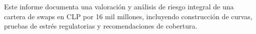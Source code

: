 \documentclass[
	spanish, %
	a4paper, oneside
]{article}
\begin{document}
\templatePortrait

\templatePagecfg

\begin{abstractd}
	Este informe documenta una valoración y análisis de riesgo integral de una cartera de swaps en CLP por 16 mil millones, incluyendo construcción de curvas, pruebas de estrés regulatorias y recomendaciones de cobertura.
\end{abstractd}

\templateIndex

\templateFinalcfg




\end{document}
